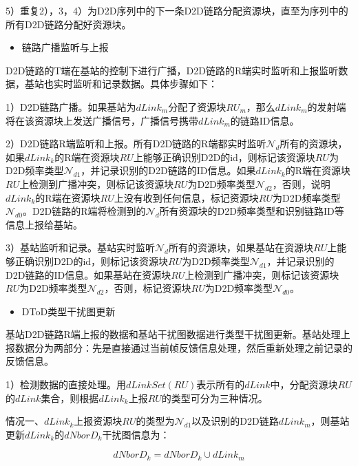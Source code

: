 \documentclass[figurelist,tablelist,algorithmlist,nomlist,masters]{seuthesix}
\begin{document}
	5）重复2），3，4）为D2D序列中的下一条D2D链路分配资源块，直至为序列中的所有D2D链路分配好资源块。


	\begin{itemize}
		\item 链路广播监听与上报
	\end{itemize}

	D2D链路的T端在基站的控制下进行广播，D2D链路的R端实时监听和上报监听数据，基站也实时监听和记录数据。具体步骤如下：

	1）D2D链路广播。如果基站为$dLink_m$分配了资源块$RU_m$，那么$dLink_m$的发射端将在该资源块上发送广播信号，广播信号携带$dLink_m$的链路ID信息。

	2）D2D链路R端监听和上报。所有D2D链路的R端都实时监听$\mathcal{N}_d$所有的资源块，如果$dLink_k$的R端在资源块$RU$上能够正确识别D2D的id，则标记该资源块$RU$为D2D频率类型$\mathcal{N}_{d1}$，并记录识别的D2D链路的ID信息。如果$dLink_k$的R端在资源块$RU$上检测到广播冲突，则标记该资源块$RU$为D2D频率类型$\mathcal{N}_{d2}$，否则，说明$dLink_k$的R端在资源块$RU$上没有收到任何信息，标记资源块$RU$为D2D频率类型$\mathcal{N}_{d0}$。D2D链路的R端将检测到的$\mathcal{N}_d$所有资源块的D2D频率类型和识别链路ID等信息上报给基站。

	3）基站监听和记录。基站实时监听$\mathcal{N}_d$所有的资源块，如果基站在资源块$RU$上能够正确识别D2D的id，则标记该资源块$RU$为D2D频率类型$\mathcal{N}_{d1}$，并记录识别的D2D链路的ID信息。如果基站在资源块$RU$上检测到广播冲突，则标记该资源块$RU$为D2D频率类型$\mathcal{N}_{d2}$，否则，标记资源块$RU$为D2D频率类型$\mathcal{N}_{d0}$。



	\begin{itemize}
		\item DToD类型干扰图更新
	\end{itemize}

	基站D2D链路R端上报的数据和基站干扰图数据进行类型干扰图更新。基站处理上报数据分为两部分：先是直接通过当前帧反馈信息处理，然后重新处理之前记录的反馈信息。

	1）检测数据的直接处理。用$dLinkSet(RU)$表示所有的$dLink$中，分配资源块$RU$的$dLink$集合，则根据$dLink_k$上报$RU$的类型可分为三种情况。

	情况一、$dLink_k$上报资源块$RU$的类型为$\mathcal{N}_{d1}$以及识别的D2D链路$dLink_m$，则基站更新$dLink_k$的$dNborD_k$干扰图信息为：

	\begin{equation}\label{eq2.12}
	dNborD_k = dNborD_k \cup dLink_m
	\end{equation}
\end{document}
